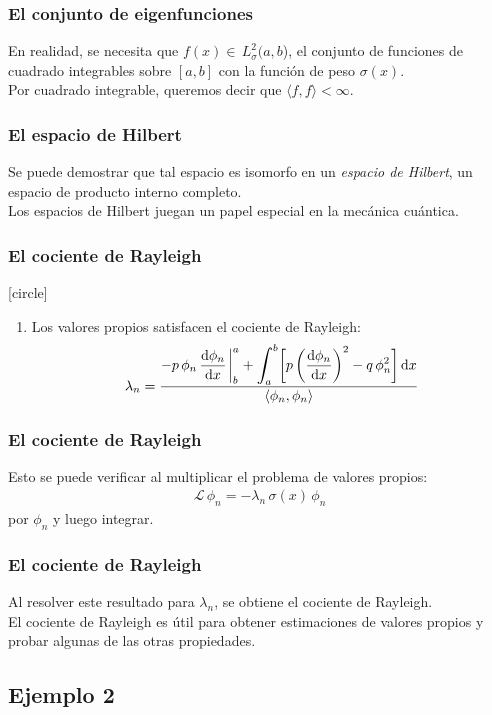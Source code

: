 \documentclass[12pt]{beamer}
\begin{document}
\begin{frame}
\frametitle{El conjunto de eigenfunciones}
En realidad, se necesita que $f (x) \in \, L_{\sigma}^{2} (a, b$), el conjunto de funciones de cuadrado integrables sobre $[a, b]$ con la función de peso $\sigma (x)$.
\\
\bigskip
\pause
Por cuadrado integrable, queremos decir que $\langle f,  f \rangle < \infty$.
\end{frame}
\begin{frame}
\frametitle{El espacio de Hilbert}
Se puede demostrar que tal espacio es isomorfo en un \emph{espacio de Hilbert}, un espacio de producto interno completo.
\\
\bigskip
\pause
Los espacios de Hilbert juegan un papel especial en la mecánica cuántica.
\end{frame}
\begin{frame}
\frametitle{El cociente de Rayleigh}
[circle]
\begin{enumerate}[<+->]
\conti
\item Los valores propios satisfacen el cociente de Rayleigh:
\pause
\begin{align*}
\lambda_{n} = \dfrac{- p \, \phi_{n} \, \displaystyle \dv{\phi_{n}}{x} \eval_{b}^{a} + \scaleint{6ex}_{\bs a}^{b} \bigg[ p \left( \dv{\phi_{n}}{x} \right)^{2} - q \, \phi_{n}^{2} \bigg] \dd{x}}{\langle  \phi_{n}, \phi_{n} \rangle} 
\end{align*}
\seti
\end{enumerate}
\end{frame}
\begin{frame}
\frametitle{El cociente de Rayleigh}
Esto se puede verificar al multiplicar el problema de valores propios:
\pause
\begin{align*}
\mathcal{L} \, \phi_{n} = - \lambda_{n} \, \sigma(x) \, \phi_{n}
\end{align*}
por $\phi_{n}$ y luego integrar.
\end{frame}
\begin{frame}
\frametitle{El cociente de Rayleigh}
Al resolver este resultado para $\lambda_{n}$, se obtiene el cociente de Rayleigh.
\\
\bigskip
\pause
El cociente de Rayleigh es útil para obtener estimaciones de valores propios y probar algunas de las otras propiedades.
\end{frame}

\subsection*{Ejemplo 2}
\end{document}
